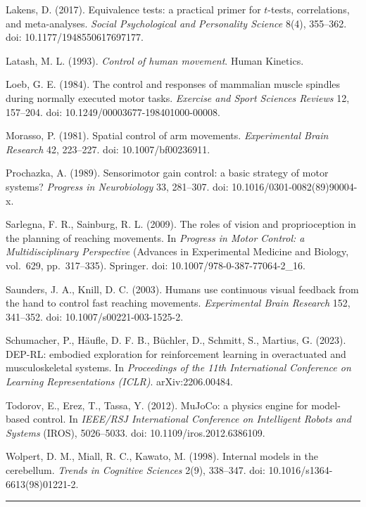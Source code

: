 \documentclass[
  11pt,
]{article}
\begin{document}
Lakens, D. (2017). Equivalence tests: a practical primer for
\(t\)-tests, correlations, and meta-analyses. \emph{Social Psychological
and Personality Science} 8(4), 355--362. doi: 10.1177/1948550617697177.

Latash, M. L. (1993). \emph{Control of human movement}. Human Kinetics.

Loeb, G. E. (1984). The control and responses of mammalian muscle
spindles during normally executed motor tasks. \emph{Exercise and Sport
Sciences Reviews} 12, 157--204. doi: 10.1249/00003677-198401000-00008.

Morasso, P. (1981). Spatial control of arm movements. \emph{Experimental
Brain Research} 42, 223--227. doi: 10.1007/bf00236911.

Prochazka, A. (1989). Sensorimotor gain control: a basic strategy of
motor systems? \emph{Progress in Neurobiology} 33, 281--307. doi:
10.1016/0301-0082(89)90004-x.

Sarlegna, F. R., Sainburg, R. L. (2009). The roles of vision and
proprioception in the planning of reaching movements. In \emph{Progress
in Motor Control: a Multidisciplinary Perspective} (Advances in
Experimental Medicine and Biology, vol.~629, pp.~317--335). Springer.
doi: 10.1007/978-0-387-77064-2\_16.

Saunders, J. A., Knill, D. C. (2003). Humans use continuous visual
feedback from the hand to control fast reaching movements.
\emph{Experimental Brain Research} 152, 341--352. doi:
10.1007/s00221-003-1525-2.

Schumacher, P., Häufle, D. F. B., Büchler, D., Schmitt, S., Martius, G.
(2023). DEP-RL: embodied exploration for reinforcement learning in
overactuated and musculoskeletal systems. In \emph{Proceedings of the
11th International Conference on Learning Representations (ICLR)}.
arXiv:2206.00484.

Todorov, E., Erez, T., Tassa, Y. (2012). MuJoCo: a physics engine for
model-based control. In \emph{IEEE/RSJ International Conference on
Intelligent Robots and Systems} (IROS), 5026--5033. doi:
10.1109/iros.2012.6386109.

Wolpert, D. M., Miall, R. C., Kawato, M. (1998). Internal models in the
cerebellum. \emph{Trends in Cognitive Sciences} 2(9), 338--347. doi:
10.1016/s1364-6613(98)01221-2.

\begin{center}\rule{0.5\linewidth}{0.5pt}\end{center}
\end{document}
